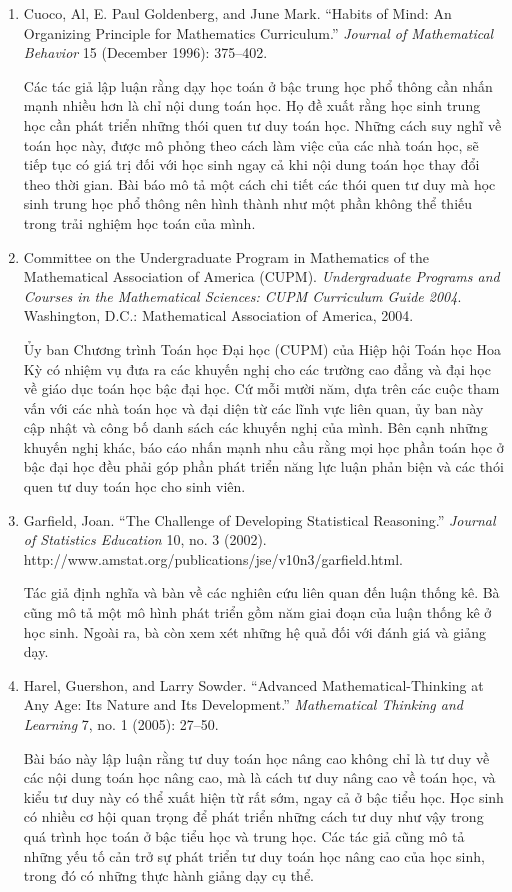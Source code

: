 \documentclass[
  10pt,
  a4paper,
  landscape,
  twoside,
  openany
]{scrbook}
\newcommand{\VI}[1]{#1}
\newcommand{\NOTE}[1]{#1}
\begin{document}
{
\VI{
  \begin{enumerate}
    \item Cuoco, Al, E. Paul Goldenberg, and June Mark. ``Habits of Mind: An Organizing Principle for Mathematics Curriculum.'' \emph{Journal of Mathematical Behavior} 15 (December 1996): 375--402.
    
      Các tác giả lập luận rằng dạy học toán ở bậc trung học phổ thông cần nhấn mạnh nhiều hơn là chỉ nội dung toán học. Họ đề xuất rằng học sinh trung học cần phát triển những thói quen tư duy toán học. Những cách suy nghĩ về toán học này, được mô phỏng theo cách làm việc của các nhà toán học, sẽ tiếp tục có giá trị đối với học sinh ngay cả khi nội dung toán học thay đổi theo thời gian. Bài báo mô tả một cách chi tiết các thói quen tư duy mà học sinh trung học phổ thông nên hình thành như một phần không thể thiếu trong trải nghiệm học toán của mình.

    \item Committee on the Undergraduate Program in Mathematics of the Mathematical Association of America (CUPM). \emph{Undergraduate Programs and Courses in the Mathematical Sciences: CUPM Curriculum Guide 2004}. Washington, D.C.: Mathematical Association of America, 2004.
    
      Ủy ban Chương trình Toán học Đại học (CUPM) của Hiệp hội Toán học Hoa Kỳ có nhiệm vụ đưa ra các khuyến nghị cho các trường cao đẳng và đại học về giáo dục toán học bậc đại học. Cứ mỗi mười năm, dựa trên các cuộc tham vấn với các nhà toán học và đại diện từ các lĩnh vực liên quan, ủy ban này cập nhật và công bố danh sách các khuyến nghị của mình. Bên cạnh những khuyến nghị khác, báo cáo nhấn mạnh nhu cầu rằng mọi học phần toán học ở bậc đại học đều phải góp phần phát triển năng lực luận phản biện và các thói quen tư duy toán học cho sinh viên.

    \item Garfield, Joan. ``The Challenge of Developing Statistical Reasoning.'' \emph{Journal of Statistics Education} 10, no. 3 (2002). http://www.amstat.org/publications/jse/v10n3/garfield.html.
    
      Tác giả định nghĩa và bàn về các nghiên cứu liên quan đến luận thống kê. Bà cũng mô tả một mô hình phát triển gồm năm giai đoạn của luận thống kê ở học sinh. Ngoài ra, bà còn xem xét những hệ quả đối với đánh giá và giảng dạy.

    \item Harel, Guershon, and Larry Sowder. ``Advanced Mathematical-Thinking at Any Age: Its Nature and Its Development.'' \emph{Mathematical Thinking and Learning} 7, no. 1 (2005): 27--50.

      Bài báo này lập luận rằng tư duy toán học nâng cao không chỉ là tư duy về các nội dung toán học nâng cao, mà là cách tư duy nâng cao về toán học, và kiểu tư duy này có thể xuất hiện từ rất sớm, ngay cả ở bậc tiểu học. Học sinh có nhiều cơ hội quan trọng để phát triển những cách tư duy như vậy trong quá trình học toán ở bậc tiểu học và trung học. Các tác giả cũng mô tả những yếu tố cản trở sự phát triển tư duy toán học nâng cao của học sinh, trong đó có những thực hành giảng dạy cụ thể.
  \end{enumerate}}
}
{
\NOTE{}
}
\end{document}
